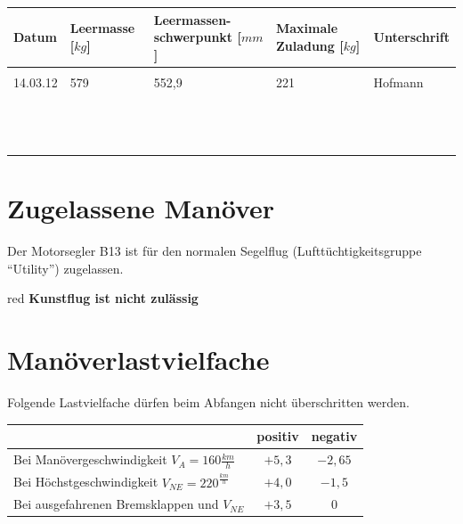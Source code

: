 \begin{tiny}
\begin{tabular}{|m{}|m{}|m{2cm}|m{}|m{}|}
\hline
Datum & Leermasse [$kg$] & Leermassen- schwerpunkt [$mm$]  & Maximale Zuladung [$kg$] & Unterschrift\\

\hline
& & & &\\
14.03.12 & 579 & 552,9 & 221 & Hofmann\\
& & & &\\
\hline
& & & &\\
& & & &\\
& & & &\\
\hline
& & & &\\
& & & &\\
& & & &\\
\hline
& & & &\\
& & & &\\
& & & &\\
\hline
& & & &\\
& & & &\\
& & & &\\
\hline

\end{tabular}
\end{tiny}


\section{Zugelassene Manöver}
Der Motorsegler B13 ist für den normalen Segelflug (Lufttüchtigkeitsgruppe "`Utility"') zugelassen.\\
\newline
\begin{color}{red}
\textbf{Kunstflug ist nicht zulässig}
\end{color}

\section{Manöverlastvielfache}

Folgende Lastvielfache dürfen beim Abfangen nicht überschritten werden.\\
\newline
\begin{tabular}{|l|c|c|}
\hline
& positiv & negativ \\
\hline
Bei Manövergeschwindigkeit $V_A=160\frac{km}{h}$ & $+5,3$ & $-2,65$\\
\hline
Bei Höchstgeschwindigkeit $V_{NE}=220^\frac{km}{h}$ & $+4,0$ & $-1,5$ \\
\hline
Bei ausgefahrenen Bremsklappen und $V_{NE}$ & $+3,5$ & $0$\\
\hline
\end{tabular}

